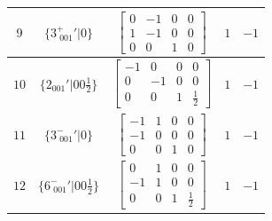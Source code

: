 \documentclass[fleqn,8pt]{jsarticle}
\begin{document}
\begin{longtable}{ccccc}
$ 9 $ & $ \{3^{+}_{\,\,001}{}'|0\} $ & $ \begin{bmatrix} 0 & -1 & 0 & 0 \\ 1 & -1 & 0 & 0 \\ 0 & 0 & 1 & 0 \end{bmatrix} $ & $ 1 $ & $ -1 $ \\ \hline
$ 10 $ & $ \{2{}_{001}{}'|0 0 \frac{1}{2}\} $ & $ \begin{bmatrix} -1 & 0 & 0 & 0 \\ 0 & -1 & 0 & 0 \\ 0 & 0 & 1 & \frac{1}{2} \end{bmatrix} $ & $ 1 $ & $ -1 $ \\ \hline
$ 11 $ & $ \{3^{-}_{\,\,001}{}'|0\} $ & $ \begin{bmatrix} -1 & 1 & 0 & 0 \\ -1 & 0 & 0 & 0 \\ 0 & 0 & 1 & 0 \end{bmatrix} $ & $ 1 $ & $ -1 $ \\ \hline
$ 12 $ & $ \{6^{-}_{\,\,001}{}'|0 0 \frac{1}{2}\} $ & $ \begin{bmatrix} 0 & 1 & 0 & 0 \\ -1 & 1 & 0 & 0 \\ 0 & 0 & 1 & \frac{1}{2} \end{bmatrix} $ & $ 1 $ & $ -1 $ \\
\end{longtable}
\end{document}
